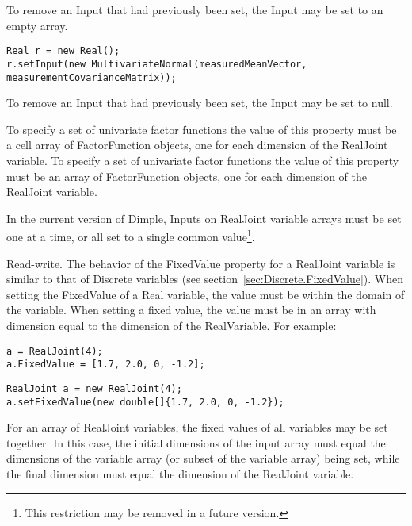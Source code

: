 To remove an Input that had previously been set, the Input may be set to an empty array.

\fi

\ifjava

\begin{lstlisting}
Real r = new Real();
r.setInput(new MultivariateNormal(measuredMeanVector, measurementCovarianceMatrix));
\end{lstlisting}

To remove an Input that had previously been set, the Input may be set to null.

\fi

\ifmatlab
To specify a set of univariate factor functions the value of this property must be a cell array of FactorFunction objects, one for each dimension of the RealJoint variable.
\fi
\ifjava
To specify a set of univariate factor functions the value of this property must be an array of FactorFunction objects, one for each dimension of the RealJoint variable.
\fi

\ifmatlab
In the current version of Dimple, Inputs on RealJoint variable arrays must be set one at a time, or all set to a single common value\footnote{This restriction may be removed in a future version.}.
\fi


\label{sec:RealJoint.FixedValue}

Read-write.  The behavior of the FixedValue property for a RealJoint variable is similar to that of Discrete variables (see section~\ref{sec:Discrete.FixedValue}).  When setting the FixedValue of a Real variable, the value must be within the domain of the variable.  When setting a fixed value, the value must be in an array with dimension equal to the dimension of the RealVariable.  For example:

\ifmatlab
\begin{lstlisting}
a = RealJoint(4);
a.FixedValue = [1.7, 2.0, 0, -1.2];
\end{lstlisting}
\fi

\ifjava
\begin{lstlisting}
RealJoint a = new RealJoint(4);
a.setFixedValue(new double[]{1.7, 2.0, 0, -1.2});
\end{lstlisting}
\fi

\ifmatlab
For an array of RealJoint variables, the fixed values of all variables may be set together.  In this case, the initial dimensions of the input array must equal the dimensions of the variable array (or subset of the variable array) being set, while the final dimension must equal the dimension of the RealJoint variable.
\fi

